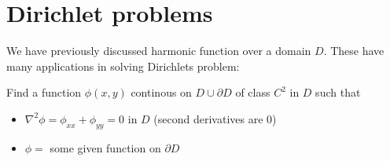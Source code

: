 \section{Dirichlet problems}\par
\noindent We have previously discussed harmonic function over a domain $D$. These have many applications in solving Dirichlets problem:
\par\bigskip
 Find a function $\phi(x,y)$ continous on $D\cup\partial D$ of class $C^2$ in $D$ such that\par
 \begin{itemize}
   \item$\nabla^2\phi = \phi_{xx}+\phi_{yy} =0$ in $D$ (second derivatives are 0)
   \item $\phi = $ some given function on $\partial D$ 
 \end{itemize}
\par\bigskip
